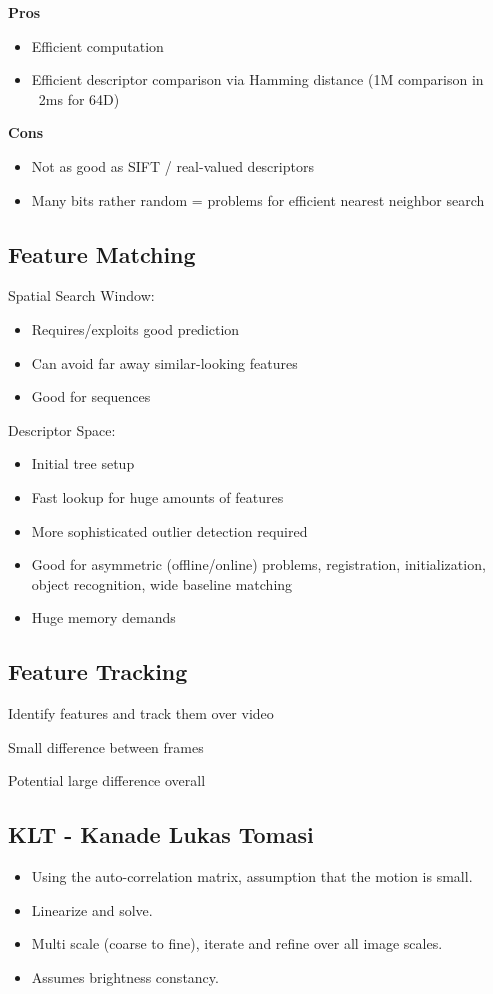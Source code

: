 \textbf{Pros}
\begin{itemize}
\item Efficient computation
\item Efficient descriptor comparison via Hamming distance (1M comparison in ~2ms for 64D)
\end{itemize}

\textbf{Cons}
\begin{itemize}
\item Not as good as SIFT / real-valued descriptors
\item Many bits rather random = problems for efficient nearest neighbor search
\end{itemize}


\subsection{Feature Matching}

Spatial Search Window:
\begin{itemize}
\item Requires/exploits good prediction
\item Can avoid far away similar-looking features
\item Good for sequences
\end{itemize}

Descriptor Space:
\begin{itemize}
\item Initial tree setup
\item Fast lookup for huge amounts of features
\item More sophisticated outlier detection required
\item Good for asymmetric (offline/online) problems, registration, initialization, object recognition, wide baseline matching
\item Huge memory demands
\end{itemize}



\subsection{Feature Tracking}

Identify features and track them over video

Small difference between frames

Potential large difference overall

\subsection{KLT - Kanade Lukas Tomasi}
\begin{itemize}
\item Using the auto-correlation matrix, assumption that the motion is small.
\item Linearize and solve.
\item Multi scale (coarse to fine), iterate and refine over all image scales.
\item Assumes brightness constancy.
\end{itemize}

